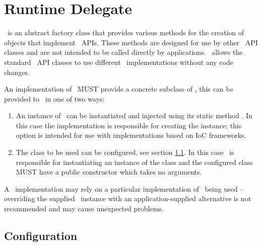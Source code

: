 \chapter{Runtime Delegate}

\rd\ is an abstract factory class that provides various methods for the creation of objects that implement \jaxrs\ APIs. These methods are designed for use by other \jaxrs\ API classes and are not intended to be called directly by applications. \rd\ allows the standard \jaxrs\ API classes to use different \jaxrs\ implementations without any code changes.

An implementation of \jaxrs\ MUST provide a concrete subclass of \rd, this can be provided to \jaxrs\ in one of two ways:

\begin{enumerate}
\item An instance of \rd\ can be instantiated and injected using its static method . In this case the implementation is responsible for creating the instance; this option is intended for use with implementations based on IoC frameworks.
\item The class to be used can be configured, see section \ref{rdconfig}. In this case \jaxrs\ is responsible for instantiating an instance of the class and the configured class MUST have a public constructor which takes no arguments.
\end{enumerate}

A \jaxrs\ implementation may rely on a particular implementation of \rd\ being used -- overriding the supplied \rd\ instance with an application-supplied alternative is not recommended and may cause unexpected problems. 

\section{Configuration}\label{rdconfig}

